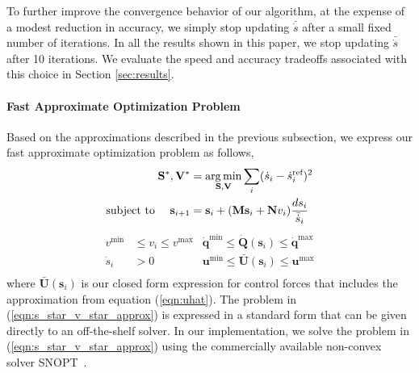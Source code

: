 To further improve the convergence behavior of our algorithm, at the expense of a modest reduction in accuracy, we simply stop updating $\bar{\dot{s}}$ after a small fixed number of iterations.
In all the results shown in this paper, we stop updating $\bar{\dot{s}}$ after 10 iterations.
We evaluate the speed and accuracy tradeoffs associated with this choice in Section \ref{sec:results}.

\paragraph{Fast Approximate Optimization Problem}

Based on the approximations described in the previous subsection, we express our fast approximate optimization problem as follows, 
%
\begin{equation*}
\begin{aligned}
\mathbf{S}^{*},\mathbf{V}^{*} & = \operatorname*{arg\,min}_{\mathbf{S},\mathbf{V}} \sum_{i} ( \dot{s}_i - \dot{s}_i^{\text{ref}} )^{2} \\
\text{subject to~~~~}
\mathbf{s}_{i+1}              & =    \mathbf{s}_{i} + (\mathbf{M}\mathbf{s}_{i} + \mathbf{N}v_{i}) \frac{ds_i}{\bar{\dot{s}}_i} \\
\end{aligned}
\end{equation*}
%
\begin{equation}
\begin{aligned}
v^{\text{min}}  & \leq v_i \leq v^{\text{max}} & \dot{\mathbf{q}}^{\text{min}} \leq \dot{\mathbf{Q}}(\mathbf{s}_i) \leq \dot{\mathbf{q}}^{\text{max}} \\
\dot{s}_i       & > 0                                   & \mathbf{u}^{\text{min}}       \leq \bar{\mathbf{U}}(\mathbf{s}_i)       \leq \mathbf{u}^{\text{max}} \\
\end{aligned}
\label{eqn:s_star_v_star_approx}
\end{equation}
%
where $\bar{\mathbf{U}}(\mathbf{s}_i)$ is our closed form expression for control forces that includes the approximation from equation (\ref{eqn:uhat}).
The problem in (\ref{eqn:s_star_v_star_approx}) is expressed in a standard form that can be given directly to an off-the-shelf solver.
In our implementation, we solve the problem in (\ref{eqn:s_star_v_star_approx}) using the commercially available non-convex solver SNOPT~\cite{gill:2002}.


